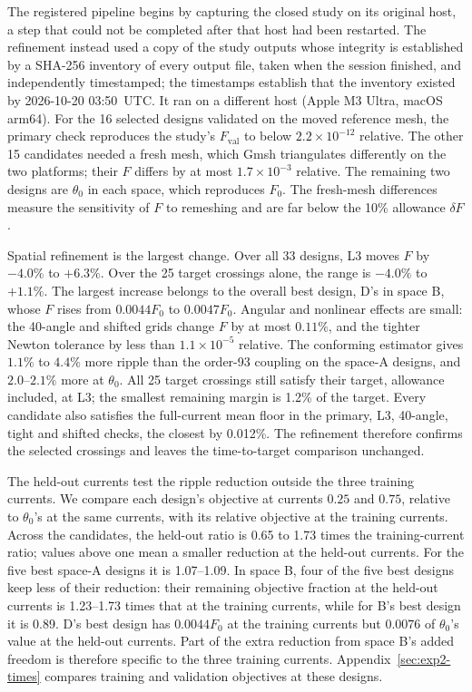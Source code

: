 The registered pipeline begins by capturing the closed study on its
original host, a step that could not be completed after that host had been
restarted. The refinement instead used a copy of the study outputs whose
integrity is established by a SHA-256 inventory of every output file, taken
when the session finished, and independently timestamped; the timestamps
establish that the inventory existed by 2026-10-20 03:50~UTC. It ran on a different host (Apple M3 Ultra,
macOS arm64). For the 16 selected designs validated on the moved reference
mesh, the primary check reproduces the study's $F_{\mathrm{val}}$ to below
$2.2\times10^{-12}$ relative. The other 15 candidates needed a fresh mesh,
which Gmsh triangulates differently on the two platforms; their $F$
differs by at most $1.7\times10^{-3}$ relative. The remaining two designs
are $\theta_0$ in each space, which reproduces $F_0$. The fresh-mesh
differences measure the sensitivity of $F$ to remeshing and are far below
the 10\% allowance $\delta F$.

Spatial refinement is the largest change. Over all 33 designs, L3 moves
$F$ by $-4.0\%$ to $+6.3\%$. Over the 25 target crossings alone, the range
is $-4.0\%$ to $+1.1\%$. The largest increase belongs to the overall best
design, D's in space B, whose $F$ rises from $0.0044F_0$ to $0.0047F_0$.
Angular and nonlinear effects are small: the 40-angle and shifted grids
change $F$ by at most $0.11\%$, and the tighter Newton tolerance by less
than $1.1\times10^{-5}$ relative. The conforming estimator gives $1.1\%$ to
$4.4\%$ more ripple than the order-93 coupling on the space-A designs, and
$2.0$--$2.1\%$ more at $\theta_0$. All 25 target crossings still satisfy
their target, allowance included, at L3; the smallest remaining margin is
1.2\% of the target. Every candidate also satisfies the full-current mean
floor in the primary, L3, 40-angle, tight and shifted checks, the closest
by 0.012\%. The refinement therefore confirms the selected crossings and
leaves the time-to-target comparison unchanged.

The held-out currents test the ripple reduction outside the three training
currents. We compare each design's objective at currents $0.25$ and $0.75$,
relative to $\theta_0$'s at the same currents, with its relative objective
at the training currents. Across the candidates, the held-out ratio is 0.65
to 1.73 times the training-current ratio; values above one mean a smaller
reduction at the held-out currents. For the five best space-A designs it
is 1.07--1.09. In space B, four of the five best designs keep less of
their reduction: their remaining objective fraction at the held-out currents
is 1.23--1.73 times that at the training currents, while for B's best
design it is 0.89. D's best design has $0.0044F_0$ at the training currents but
$0.0076$ of $\theta_0$'s value at the held-out currents. Part of the extra
reduction from space B's added freedom is therefore specific to the three
training currents. Appendix~\ref{sec:exp2-times} compares training and
validation objectives at these designs.

